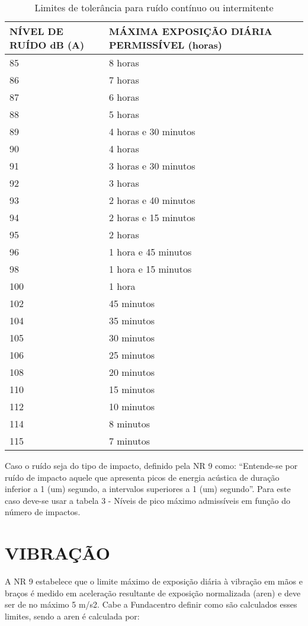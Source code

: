 \begin{table}[]
    \centering
    \begin{tabular}{ | l | l | }
\hline
	NÍVEL DE RUÍDO dB (A) & MÁXIMA EXPOSIÇÃO DIÁRIA PERMISSÍVEL (horas) \\ \hline
	85 & 8 horas \\ 
	86 & 7 horas \\ 
	87 & 6 horas \\ 
	88 & 5 horas \\ 
	89 & 4 horas e 30 minutos \\ 
	90 & 4 horas \\ 
	91 & 3 horas e 30 minutos \\ 
	92 & 3 horas \\
	93 & 2 horas e 40 minutos \\ 
	94 & 2 horas e 15 minutos \\
	95 & 2 horas \\
	96 & 1 hora e 45 minutos \\
	98 & 1 hora e 15 minutos \\
	100 & 1 hora \\
	102 & 45 minutos \\
	104 & 35 minutos \\
	105 & 30 minutos \\
	106 & 25 minutos \\
	108 & 20 minutos \\ 
	110 & 15 minutos \\ 
	112 & 10 minutos \\ 
	114 & 8 minutos \\
	115 & 7 minutos \\ \hline
\end{tabular}
    \caption{Limites de tolerância para ruído contínuo ou intermitente}
    \label{tab:limitesDeTolerancia}
\end{table}

Caso o ruído seja do tipo de impacto, definido pela NR 9 como: “Entende-se por ruído de impacto aquele que apresenta picos de energia acústica de duração inferior a 1 (um) segundo, a intervalos superiores a 1 (um) segundo”. Para este caso deve-se usar a tabela 3 - Níveis de pico máximo admissíveis em função do número de impactos.

\section{VIBRAÇÃO}
\label{subsec: vibracao}

A NR 9 estabelece que o limite máximo de exposição diária à vibração em mãos e braços é medido em aceleração resultante de exposição normalizada (aren) e deve ser de no máximo 5 m/s2. Cabe a Fundacentro definir como são calculados esses limites, sendo a aren é calculada por:

